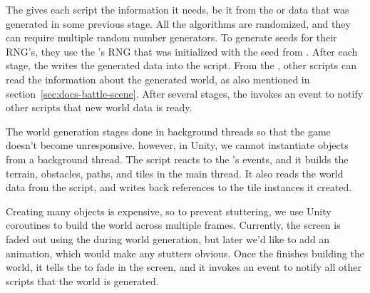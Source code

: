 The  gives each script the information it needs, be it from the  or data that was generated in some previous stage.
All the algorithms are randomized, and they can require multiple random number generators.
To generate seeds for their RNG's, they use the 's RNG that was initialized with the seed from .
After each stage, the  writes the generated data into the  script.
From the , other scripts can read the information about the generated world, as also mentioned in section~\ref{sec:docs-battle-scene}.
After several stages, the  invokes an event to notify other scripts that new world data is ready.

The world generation stages done in background threads so that the game doesn't become unresponsive.
however, in Unity, we cannot instantiate objects from a background thread.
The script  reacts to the 's events, and it builds the terrain, obstacles, paths, and tiles in the main thread.
It also reads the world data from the  script, and writes back references to the tile instances it created.

Creating many objects is expensive, so to prevent stuttering, we use Unity coroutines to build the world across multiple frames.
Currently, the screen is faded out using the  during world generation, but later we'd like to add an animation, which would make any stutters obvious.
Once the  finishes building the world, it tells the  to fade in the screen, and it invokes an event to notify all other scripts that the world is generated.